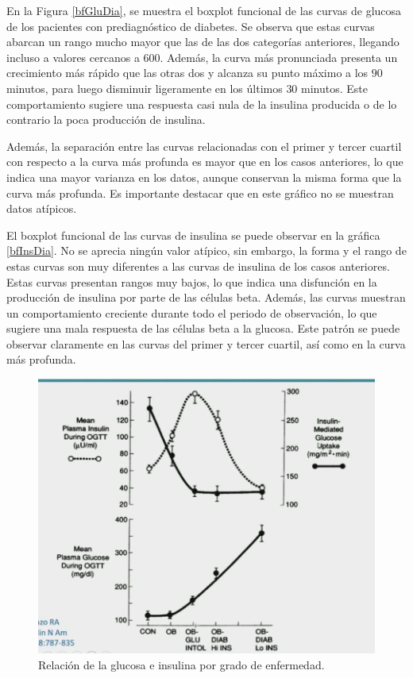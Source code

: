 En la Figura \ref{bfGluDia}, se muestra el boxplot funcional de las curvas de glucosa de los pacientes con prediagnóstico de diabetes. Se observa que estas curvas abarcan un rango mucho mayor que las de las dos categorías anteriores, llegando incluso a valores cercanos a $600$. Además, la curva más pronunciada presenta un crecimiento más rápido que las otras dos y alcanza su punto máximo a los $90$ minutos, para luego disminuir ligeramente en los últimos $30$ minutos. Este comportamiento sugiere una respuesta casi nula de la insulina producida o de lo contrario la poca producción de insulina. 

Además, la separación entre las curvas relacionadas con el primer y tercer cuartil con respecto a la curva más profunda es mayor que en los casos anteriores, lo que indica una mayor varianza en los datos, aunque conservan la misma forma que la curva más profunda. Es importante destacar que en este gráfico no se muestran datos atípicos.

El boxplot funcional de las curvas de insulina se puede observar en la gráfica \ref{bfInsDia}. No se aprecia ningún valor atípico, sin embargo, la forma y el rango de estas curvas son muy diferentes a las curvas de insulina de los casos anteriores. Estas curvas presentan rangos muy bajos, lo que indica una disfunción en la producción de insulina por parte de las células beta. Además, las curvas muestran un comportamiento creciente durante todo el periodo de observación, lo que sugiere una mala respuesta de las células beta a la glucosa.  Este patrón se puede observar claramente en las curvas del primer y tercer cuartil, así como en la curva más profunda.

\begin{figure}[H]
    \centering
    \includegraphics[width = 0.8 \textwidth]{Imagenes/InsulinaGlucosa.png}
    \caption{Relación de la glucosa e insulina por grado de enfermedad.}
    \label{fig:relGluIns}
\end{figure}

